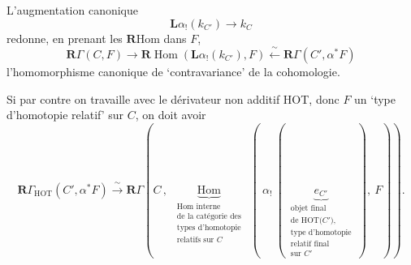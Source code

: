 L'augmentation canonique
\[ \mathbf{L}\alpha_!(k_{C'}) \longrightarrow k_C \]
redonne, en prenant les $\mathbf{R}\mathrm{Hom}$ dans $F$,
\[ \mathbf{R}\Gamma(C,F) \longrightarrow \mathbf{R}\operatorname{Hom}(\mathbf{L}\alpha_!(k_{C'}), F) \xleftarrow{\ \sim\ } \mathbf{R}\Gamma(C', \alpha^*F) \]
l'homomorphisme canonique de `contravariance' de la cohomologie.

Si par contre on travaille avec le dérivateur non additif HOT, donc $F$ un `type d'homotopie relatif' sur $C$, on doit avoir
\[ \boxed{\mathbf{R}\Gamma_{\mathrm{HOT}}(C', \alpha^*F) \xrightarrow{\ \sim\ } \mathbf{R}\Gamma(C\,,\ \underbrace{\operatorname{Hom}}_{\substack{\text{Hom interne}\\ \text{de la catégorie des}\\ \text{types d'homotopie}\\ \text{relatifs sur $C$}}}\ (\ \alpha_!\ (\ \underbrace{e_{C'}}_{\substack{\text{objet final}\\ \text{de HOT($C'$),}\\ \text{type d'homotopie}\\ \text{relatif final}\\ \text{sur $C'$}}}\ ),\ F)).} \]

